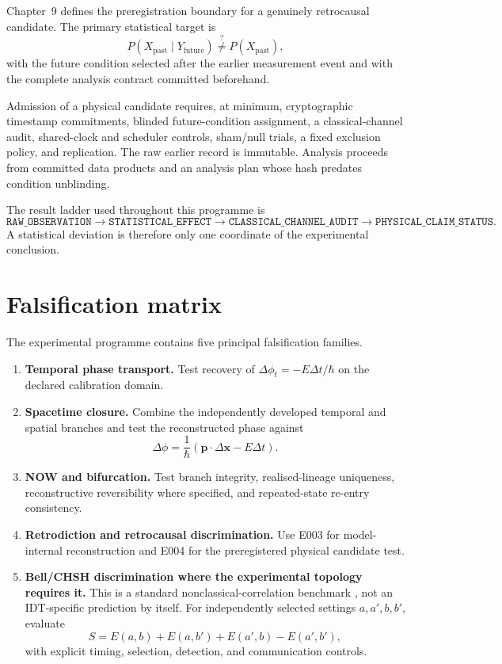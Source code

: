 Chapter~9 defines the preregistration boundary for a genuinely retrocausal candidate. The primary statistical target is
\[
P(X_{\mathrm{past}}\mid Y_{\mathrm{future}})
\stackrel{?}{\neq}
P(X_{\mathrm{past}}),
\]
with the future condition selected after the earlier measurement event and with the complete analysis contract committed beforehand.

Admission of a physical candidate requires, at minimum, cryptographic timestamp commitments, blinded future-condition assignment, a classical-channel audit, shared-clock and scheduler controls, sham/null trials, a fixed exclusion policy, and replication. The raw earlier record is immutable. Analysis proceeds from committed data products and an analysis plan whose hash predates condition unblinding.

The result ladder used throughout this programme is
\[
\texttt{RAW\_OBSERVATION}
\rightarrow
\texttt{STATISTICAL\_EFFECT}
\rightarrow
\texttt{CLASSICAL\_CHANNEL\_AUDIT}
\rightarrow
\texttt{PHYSICAL\_CLAIM\_STATUS}.
\]
A statistical deviation is therefore only one coordinate of the experimental conclusion.

\section{Falsification matrix}

The experimental programme contains five principal falsification families.

\begin{enumerate}
\item \textbf{Temporal phase transport.} Test recovery of \(\Delta\phi_t=-E\Delta t/\hbar\) on the declared calibration domain.
\item \textbf{Spacetime closure.} Combine the independently developed temporal and spatial branches and test the reconstructed phase against
\[
\Delta\phi=\frac{1}{\hbar}
\left(\mathbf p\cdot\Delta\mathbf x-E\Delta t\right).
\]
\item \textbf{NOW and bifurcation.} Test branch integrity, realised-lineage uniqueness, reconstructive reversibility where specified, and repeated-state re-entry consistency.
\item \textbf{Retrodiction and retrocausal discrimination.} Use E003 for model-internal reconstruction and E004 for the preregistered physical candidate test.
\item \textbf{Bell/CHSH discrimination where the experimental topology requires it.} This is a standard nonclassical-correlation benchmark \cite{Bell1964,CHSH1969}, not an IDT-specific prediction by itself. For independently selected settings \(a,a',b,b'\), evaluate
\[
S=E(a,b)+E(a,b')+E(a',b)-E(a',b'),
\]
with explicit timing, selection, detection, and communication controls.
\end{enumerate}

